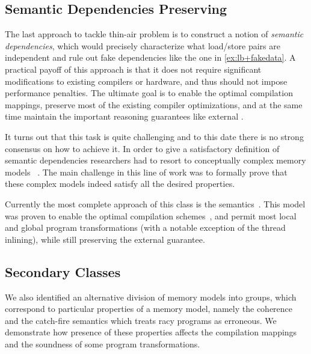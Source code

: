\subsection{Semantic Dependencies Preserving}
\label{sec:analysis:sdeprf}

The last approach to tackle thin-air problem is to   
construct a notion of \emph{semantic dependencies}, 
which would precisely characterize what load/store 
pairs are independent and rule out fake dependencies 
like the one in \ref{ex:lb+fakedata}.
A practical payoff of this approach is that it 
does not require significant modifications to existing compilers or hardware, 
and thus should not impose performance penalties.  
The ultimate goal is to enable the optimal compilation mappings, 
preserve most of the existing compiler optimizations, 
and at the same time maintain the important 
reasoning guarantees like external \DRF. 

It turns out that this task is quite challenging 
and to this date there is no strong consensus on how to achieve it.
In order to give a satisfactory definition of semantic dependencies 
researchers had to resort to conceptually complex memory models%
~\cite{Jagadeesan-al:ESOP10, Kang-al:POPL17, Jeffrey-Riely:LICS16, 
PichonPharabod-Sewell:POPL16, Chakraborty-Vafeiadis:POPL19, Paviotti-al:ESOP20}.
The main challenge in this line of work was to formally prove 
that these complex models indeed satisfy all the desired properties. 

Currently the most complete approach of this class 
is the \Promising semantics~\cite{Kang-al:POPL17, Lee-al:PLDI20}. 
This model was proven to enable the optimal compilation schemes~\cite{Podkopaev-al:POPL19}, 
and permit most local and global program transformations
(with a notable exception of the thread inlining), 
while still preserving the external \DRF guarantee.

\subsection{Secondary Classes}
\label{sec:analysis:other}

We also identified an alternative division of memory models into groups, 
which correspond to particular properties of a memory model, 
namely the coherence and the catch-fire semantics which treats racy programs 
as erroneous. We demonstrate how presence of these properties 
affects the compilation mappings and the soundness of some program transformations.


